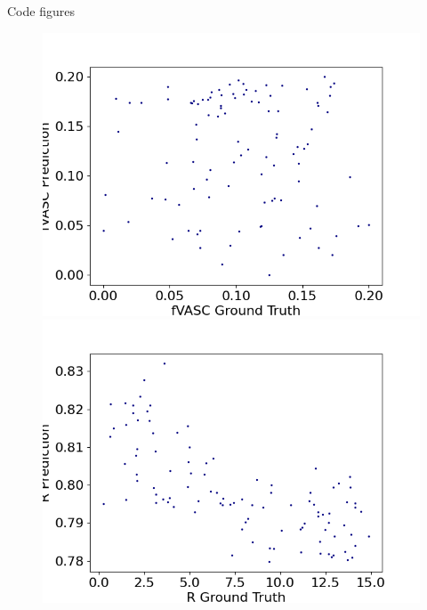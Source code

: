 \documentclass{beamer}
\begin{document}
\begin{frame}{Code figures}
\begin{figure}
\begin{minipage}[b]{0.4\linewidth}
    \includegraphics[width=\linewidth]{Weekly meeting slides/meeting 2/Figure_3.png} 
  \end{minipage} 
  \hfill
  \begin{minipage}[b]{0.4\linewidth}
  \centering
    \includegraphics[width=\linewidth]{Weekly meeting slides/meeting 2/Figure_4.png} 
  \end{minipage} 
\end{figure}
\end{frame}
\end{document}
